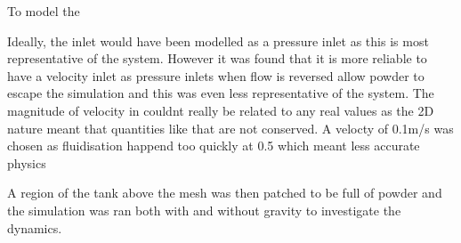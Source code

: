 To model the 



Ideally, the inlet would have been modelled as a pressure inlet as this is most representative of the system. However it was found that it is more reliable to have a velocity inlet as pressure inlets when flow is reversed allow powder to escape the simulation and this was even less representative of the system. The magnitude of velocity in couldnt really be related to any real values as the 2D nature meant that quantities like that are not conserved. A velocty of 0.1m/s was chosen as fluidisation happend too quickly at 0.5 which meant less accurate physics

A region of the tank above the mesh was then patched to be full of powder and the simulation was ran both with and without gravity to investigate the dynamics.
\newpage
